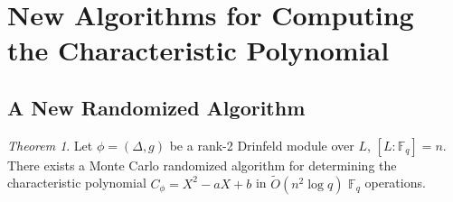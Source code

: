 \documentclass{jams-l}
\theoremstyle{remark}
\numberwithin{equation}{section}
\newtheorem{theorem}{Theorem}
\begin{document}
\section{New Algorithms for Computing the Characteristic Polynomial}






\subsection{A New Randomized Algorithm}

\begin{theorem}
Let $\phi = (\Delta, g)$ be a rank-2 Drinfeld module over $L$, $[L: \mathbb{F}_q] = n$. There exists a Monte Carlo randomized algorithm for determining the characteristic polynomial $C_{\phi} = X^2 -aX + b$ in $\widetilde{O}(n^2 \log q)$ $\mathbb{F}_q$ operations.
\end{theorem}
\end{document}
